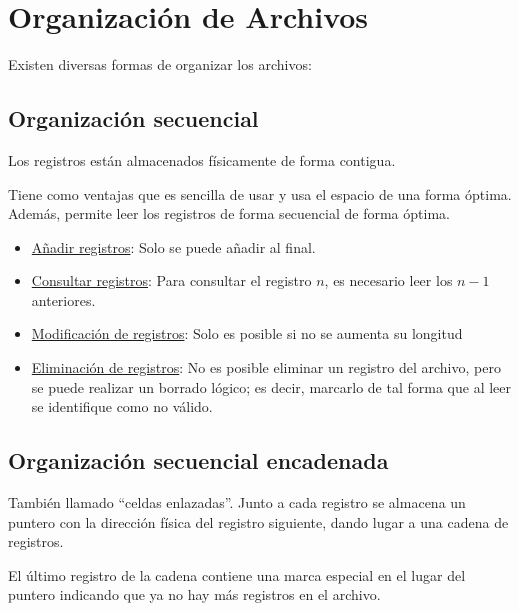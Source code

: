 \section{Organización de Archivos}

Existen diversas formas de organizar los archivos:
\subsection{Organización secuencial}
Los registros están almacenados físicamente de forma contigua.

Tiene como ventajas que es sencilla de usar y usa el espacio de una forma óptima. Además, permite leer los registros de forma secuencial de forma óptima.
\begin{itemize}
    \item \underline{Añadir registros}: Solo se puede añadir al final.
    \item \underline{Consultar registros}: Para consultar el registro $n$, es necesario leer los $n-1$ anteriores.
    \item \underline{Modificación de registros}: Solo es posible si no se aumenta su longitud
    \item \underline{Eliminación de registros}: No es posible eliminar un registro del archivo, pero se puede realizar un borrado lógico; es decir, marcarlo de tal forma que al leer se identifique como no válido.
\end{itemize}

\subsection{Organización secuencial encadenada}

También llamado ``celdas enlazadas''. Junto a cada registro se almacena un puntero con la dirección física del registro siguiente, dando lugar a una cadena de registros.

El último registro de la cadena contiene una marca especial en el lugar del puntero indicando que ya no hay más registros en el archivo.

